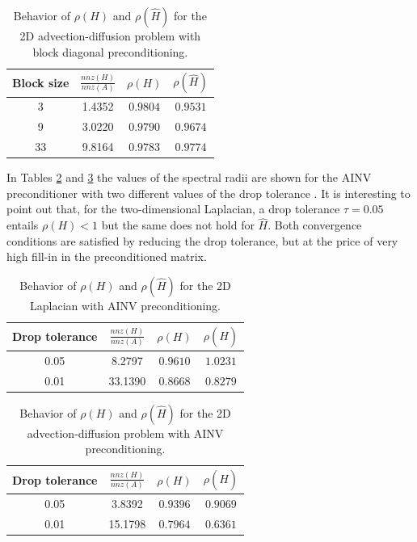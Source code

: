 \documentclass[times]{nlaauth}
\begin{document}
\begin{table}[!t]
\centering
\begin{tabular}{|c|c|c|c|}
\hline
\textbf{Block size} & \textbf{$\frac{nnz(H)}{nnz(A)}$}& $\rho(H)$
&$\rho(\hat{H})$\\
\hline
 3 & 1.4352 & $0.9804$ & $0.9531$\\
\hline
 9 & 3.0220 & $0.9790$ & $0.9674$\\
\hline
 33 & 9.8164 & $0.9783$  & $0.9774$\\
\hline
\end{tabular}
\caption{Behavior of $\rho(H)$ and $\rho(\hat{H})$ for the
2D advection-diffusion problem with block diagonal preconditioning.}
\label{tab:ifiss_block}
\end{table}

In Tables \ref{tab:lap2d_ainv} and \ref{tab:ifiss_ainv} the values of
the spectral radii are shown for the AINV
preconditioner with two different values of the drop tolerance
\cite{BMT1996,BT1998}. It is interesting to point out that, for the
two-dimensional
Laplacian, a drop tolerance $\tau=0.05$ entails $\rho(H)<1$ but the same does
not hold for $\hat{H}$. Both convergence conditions are satisfied by
reducing the drop tolerance, but at the price of very high fill-in in the
preconditioned matrix.


\begin{table}[!t]
\centering
\begin{tabular}{|c|c|c|c|}
\hline
\textbf{Drop tolerance} & \textbf{$\frac{nnz(H)}{nnz(A)}$}& $\rho(H)$
&$\rho(\hat{H})$\\
\hline
 0.05 & 8.2797 & $0.9610$ & $1.0231$\\
\hline
 0.01 & 33.1390 & $0.8668$ & $0.8279$\\
\hline
\end{tabular}
\caption{Behavior of $\rho(H)$ and $\rho(\hat{H})$ for the
2D Laplacian with AINV preconditioning.}
\label{tab:lap2d_ainv}
\end{table}

\begin{table}[!t]
\centering
\begin{tabular}{|c|c|c|c|}
\hline
\textbf{Drop tolerance} & \textbf{$\frac{nnz(H)}{nnz(A)}$}& $\rho(H)$
&$\rho(\hat{H})$\\
\hline
 0.05 & 3.8392 & $0.9396$ & $0.9069$\\
\hline
 0.01 & 15.1798 & $0.7964$ & $0.6361$\\
\hline
\end{tabular}
\caption{Behavior of $\rho(H)$ and $\rho(\hat{H})$ for the 2D
advection-diffusion problem with AINV preconditioning.}
\label{tab:ifiss_ainv}
\end{table}
\end{document}
